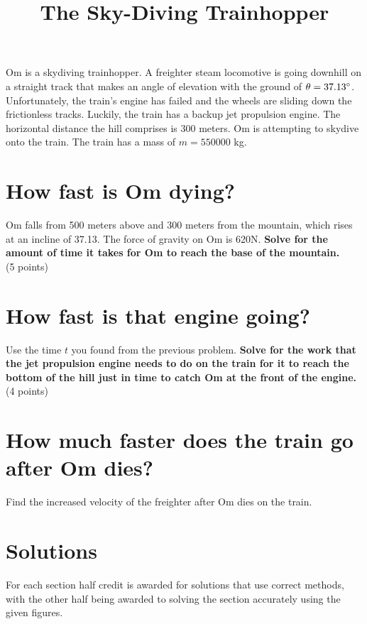 \documentclass{article}
\title{\vspace{-3em}The Sky-Diving Trainhopper\vspace{-3em}}
\begin{document}
\fontsize{14}{16}\selectfont

\maketitle

Om is a skydiving trainhopper. A freighter steam locomotive is going downhill on a straight track that makes an angle of elevation with the ground of $\theta=37.13\degree$. Unfortunately, the train's engine has failed and the wheels are sliding down the frictionless tracks. Luckily, the train has a backup jet propulsion engine. The horizontal distance the hill comprises is 300 meters. Om is attempting to skydive onto the train. The train has a mass of $m=550000$ kg.

\section{How fast is Om dying?} 
Om falls from 500 meters above and 300 meters from the mountain, which rises at an incline of 37.13\degree. The force of gravity on Om is 620N. \textbf{Solve for the amount of time it takes for Om to reach the base of the mountain.} \\
(5 points)

\section{How fast is that engine going?}
Use the time $t$ you found from the previous problem. \textbf{Solve for the work that the jet propulsion engine needs to do on the train for it to reach the bottom of the hill just in time to catch Om at the front of the engine.} \\
(4 points)

\section{How much faster does the train go after Om dies?}
Find the increased velocity of the freighter after Om dies on the train. 

\pagebreak

\section{Solutions}

For each section half credit is awarded for solutions that use correct methods, with the other half being awarded to solving the section accurately using the given figures.
\end{document}
